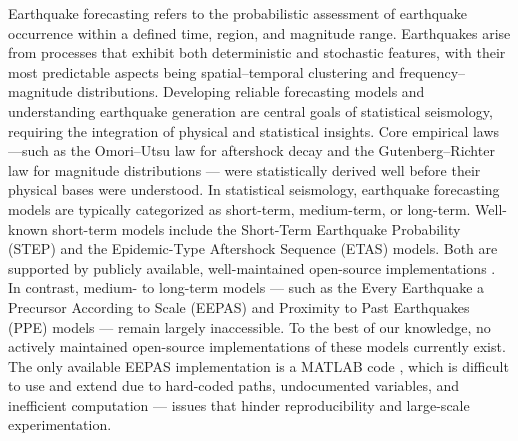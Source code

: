 \documentclass[extra,mreferee]{gji}
\theoremstyle{lemma}
\begin{document}
Earthquake forecasting refers to the probabilistic assessment of earthquake occurrence within a defined time, region, and magnitude range. Earthquakes arise from processes that exhibit both deterministic and stochastic features, with their most predictable aspects being spatial–temporal clustering and frequency–magnitude distributions. Developing reliable forecasting models and understanding earthquake generation are central goals of statistical seismology, requiring the integration of physical and statistical insights. Core empirical laws—such as the Omori–Utsu law for aftershock decay and the Gutenberg–Richter law for magnitude distributions — were statistically derived well before their physical bases were understood. In statistical seismology, earthquake forecasting models are typically categorized as short-term, medium-term, or long-term. Well-known short-term models include the Short-Term Earthquake Probability (STEP) and the Epidemic-Type Aftershock Sequence (ETAS) models. Both are supported by publicly available, well-maintained open-source implementations \cite{jalilian2019etas,mizrahi2021effect,lombardi2017seda,field2003opensha}. In contrast, medium- to long-term models — such as the Every Earthquake a Precursor According to Scale (EEPAS) \cite{RE} and Proximity to Past Earthquakes (PPE) \cite{JK} models — remain largely inaccessible. To the best of our knowledge, no actively maintained open-source implementations of these models currently exist. The only available EEPAS implementation is a MATLAB code \cite{2023ER}, which is difficult to use and extend due to hard-coded paths, undocumented variables, and inefficient computation — issues that hinder reproducibility and large-scale experimentation.
\end{document}
